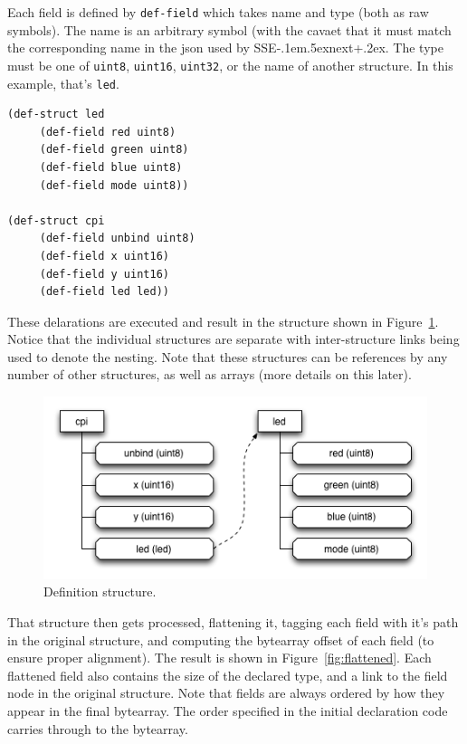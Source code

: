 \documentclass[12pt]{article}
\def\SSEnext{SSE\kern-.1em\lower.5ex\hbox{\footnotesize next}\kern+.2ex}
\def\SSEnext{SSE\kern-.1em\lower.5ex\hbox{\footnotesize next}\kern+.2ex}
\begin{document}
Each field is defined by \verb|def-field| which takes name and type
(both as raw symbols). The name is an arbitrary symbol (with the
cavaet that it must match the corresponding name in the json used by
\SSEnext. The type must be one of \verb|uint8|, \verb|uint16|,
\verb|uint32|, or the name of another structure. In this example,
that's \verb|led|.

\begin{verbatim}
(def-struct led
     (def-field red uint8)
     (def-field green uint8)
     (def-field blue uint8)
     (def-field mode uint8))

(def-struct cpi
     (def-field unbind uint8)
     (def-field x uint16)
     (def-field y uint16)
     (def-field led led))
\end{verbatim}

These delarations are executed and result in the structure shown in
Figure~\ref{fig:defstructure}. Notice that the individual structures
are separate with inter-structure links being used to denote the
nesting. Note that these structures can be references by any number of
other structures, as well as arrays (more details on this later).

\begin{figure}[htbp] %
   \centering
   \includegraphics[width=5in]{def_structure.png} 
\caption{Definition structure.}
\label{fig:defstructure}
\end{figure}

That structure then gets processed, flattening it, tagging each field
with it's path in the original structure, and computing the bytearray
offset of each field (to ensure proper alignment). The result is shown
in Figure~\ref{fig:flattened}. Each flattened field also contains the
size of the declared type, and a link to the field node in the
original structure. Note that fields are always ordered by how they
appear in the final bytearray. The order specified in the initial
declaration code carries through to the bytearray.
\end{document}
